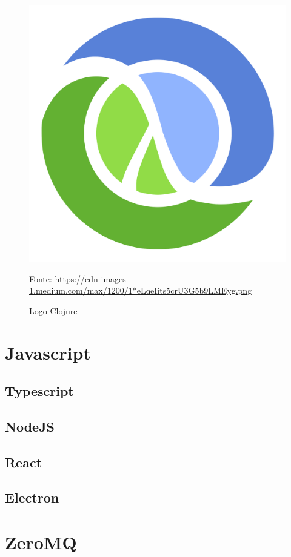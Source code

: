\documentclass[twosideprint]{politex}
\newcommand{\legend}[1]{\begin{center}\def\caption{}\caption{#1}\end{center}}
\begin{document}
	\begin{figure}
	    \centering
	    \includegraphics[scale=0.1]{pictures/clojure_logo.png}
	    \caption{Logo Clojure}
	    \legend{Fonte: \url{https://cdn-images-1.medium.com/max/1200/1*eLqeIits5crU3G5b9LMEyg.png}}
	    \label{fig:logo_clojure}
	\end{figure}
	
	\section{Javascript}
    	\subsection{Typescript}
    	\subsection{NodeJS}
    	\subsection{React}
    	\subsection{Electron}
	\section{ZeroMQ}
\end{document}
